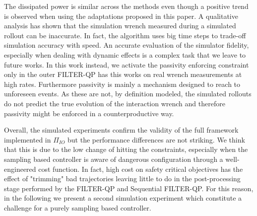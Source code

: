 The dissipated power is similar across the methods even though a positive trend is observed when using the adaptations proposed in this paper. A qualitative analysis has shown that the simulation wrench measured during a simulated rollout can be inaccurate. In fact, the algorithm uses big time steps to trade-off simulation accuracy with speed. An accurate evaluation of the simulator fidelity, especially when dealing with dynamic effects is a complex task that we leave to future works. In this work instead, we activate the passivity enforcing constraint only in the outer FILTER-QP has this works on real wrench measurements at high rates. Furthermore passivity is mainly a mechanism designed to reach to unforeseen events. As these are not, by definition modeled, the simulated rollouts do not predict the true evolution of the interaction wrench and therefore passivity might be enforced in a counterproductive way.

Overall, the simulated experiments confirm the validity of the full framework implemented in $\Pi_{IO}$ but the performance differences are not striking. We think that this is due to the low change of hitting the constraints, especially when the sampling based controller is aware of dangerous configuration through a well-engineered cost function. In fact, high cost on safety critical objectives has the effect of "trimming" bad trajectories leaving little to do in the post-processing stage performed by the FILTER-QP and Sequential FILTER-QP. For this reason, in the following we present a second simulation experiment which constitute a challenge for a purely sampling based controller. 

